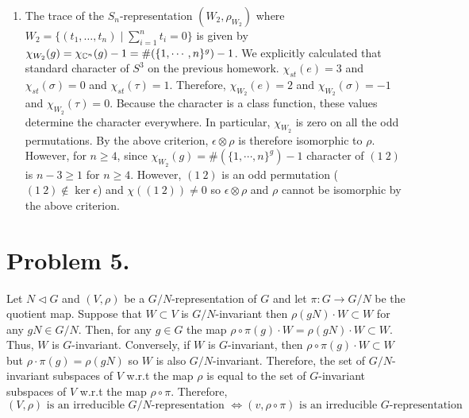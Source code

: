 \documentclass[12pt]{extarticle}
\begin{document}
\begin{enumerate}
\item The trace of the $S_n$-representation $(W_2, \rho_{W_2})$ where $W_2 = \{(t_1, \dots, t_n) \mid \sum_{i = 1}^n t_i = 0 \}$ is given by $\chi_{W_2}(g) = \chi_{\mathbb{C}^n}(g) - 1 = \#(\{1, \cdots, n\}^g) - 1$. We explicitly calculated that standard character of $S^3$ on the previous homework. $\chi_{st}(e) = 3$ and $\chi_{st}(\sigma) = 0$ and $\chi_{st}(\tau) = 1$. Therefore, $\chi_{W_2}(e) = 2$ and $\chi_{W_2}(\sigma) = -1$ and $\chi_{W_2}(\tau) = 0$. Because the character is a class function, these values determine the character everywhere. In particular, $\chi_{W_2}$ is zero on all the odd permutations. By the above criterion, $\epsilon \otimes \rho$ is therefore isomorphic to $\rho$. However, for $n \ge 4$, since $\chi_{W_2}(g) = \#(\{1, \cdots, n\}^g) - 1$ character of $(1 \: 2)$ is $n - 3 \ge 1$ for $n \ge 4$. However, $(1 \: 2)$ is an odd permutation ($(1 \: 2) \notin \ker{\epsilon}$) and $\chi((1 \: 2)) \neq 0$ so $\epsilon \otimes \rho$ and $\rho$ cannot be isomorphic by the above criterion.  
\end{enumerate}

\section*{Problem 5.}

Let $N \triangleleft G$ and $(V, \rho)$ be a $G/N$-representation of $G$ and let $\pi : G \to G/N$ be the quotient map. Suppose that $W \subset V$ is $G/N$-invariant then $\rho(gN) \cdot W \subset W$ for any $gN \in G/N$. Then, for any $g \in G$ the map $\rho \circ \pi(g) \cdot W = \rho(gN) \cdot W \subset W$. Thus, $W$ is $G$-invariant. Conversely, if $W$ is $G$-invariant, then $\rho \circ \pi(g) \cdot W \subset W$ but $\rho \cdot \pi(g) = \rho(g N)$ so $W$ is also $G/N$-invariant. Therefore, the set of $G/N$-invariant subspaces of $V$ w.r.t the map $\rho$ is equal to the set of $G$-invariant subspaces of $V$ w.r.t the map $\rho \circ \pi$. Therefore,
\[ (V, \rho) \text{ is an irreducible } G/N\text{-representation } \iff (v, \rho \circ \pi) \text{ is an irreducible } G\text{-representation} \] 
\end{document}
